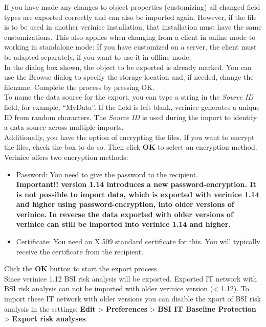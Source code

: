 \documentclass[a4paper,10pt]{book}
\begin{document}
If you have made any changes to object properties (customizing) all changed field types are exported
correctly and can also be imported again. However, if the file is to be used in another verinice
installation, that installation must have the same customizations. This also applies when changing
from a client in online mode to working in standalone mode: If you have customized on a server,
the client must be adapted separately, if you want to use it in offline mode.
\newline\\
In the dialog box shown, the object to be exported is already marked. You can use the Browse dialog
to specify the storage location and, if needed, change the filename. Complete the process by pressing OK.
\newline\\
To name the data source for the export, you can type a string in the \textit{Source ID} field, for example,
``MyData''. If the field is left blank, verinice generates a unique ID from random characters. The \textit{Source ID}
is used during the import to identify a data source across multiple imports.
\newline\\
Additionally, you have the option of encrypting the files. If you want to encrypt the files, check the
box to do so. Then click \textbf{OK} to select an encryption method.
\newline\\
Verinice offers two encryption methods:
\begin{itemize}
 \item Password: You need to give the password to the recipient.\\
 \textbf{Important!! version 1.14 introduces a new password-encryption. It is
 not possible to import data, which is exported with verinice 1.14 and higher
 using password-encryption, into older versions of verinice. In reverse the
 data exported with older versions of verinice can still be imported into
 verinice 1.14 and higher.}
 \item Certificate: You need an X.509 standard certificate for this. You will typically receive the certificate from the recipient.
\end{itemize}
Click the \textbf{OK} button to start the export process.
\newline\\
Since verinice 1.12 BSI risk analysis will be exported. Exported IT network with BSI risk analysis can not be imported with older verinice version (< 1.12).
To import these IT network with older versions you can disable the xport of BSI risk analysis in the
settings: \textbf{Edit} \textgreater \textbf{ Preferences} \textgreater \textbf{ BSI IT Baseline Protection} \textgreater \textbf{ Export risk analyses}.
\end{document}
